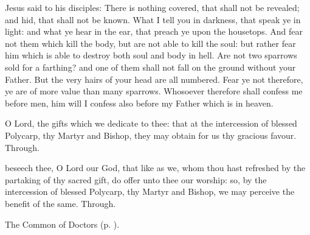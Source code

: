  Jesus said to his disciples: There is nothing covered, that shall not be revealed; and hid, that shall not be known. What I tell you in darkness, that speak ye in light: and what ye hear in the ear, that preach ye upon the housetops. And fear not them which kill the body, but are not able to kill the soul: but rather fear him which is able to destroy both soul and body in hell. Are not two sparrows sold for a farthing? and one of them shall not fall on the ground without your Father. But the very hairs of your head are all numbered. Fear ye not therefore, ye are of more value than many sparrows. Whosoever therefore shall confess me before men, him will I confess also before my Father which is in heaven.


\vspace{-0.15\baselineskip}

\secret

\vspace{-0.1\baselineskip}

 O Lord, the gifts which we dedicate to thee: that at the intercession of blessed Polycarp, thy Martyr and Bishop, they may obtain for us thy gracious favour. Through.


\vspace{-0.15\baselineskip}

\postcommunion

\vspace{-0.1\baselineskip}

 beseech thee, O Lord our God, that like as we, whom thou hast refreshed by the partaking of thy sacred gift, do offer unto thee our worship: so, by the intercession of blessed Polycarp, thy Martyr and Bishop, we may perceive the benefit of the same. Through.



\begin{rubric}
	The Common of Doctors (p. \pageref{CommonDoctors}).
\end{rubric}

